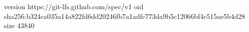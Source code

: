 version https://git-lfs.github.com/spec/v1
oid sha256:b324ca035a14a822fd6dd20246fb7a1adfc773da9b5c12066bf4c515ae5b4d28
size 43840
